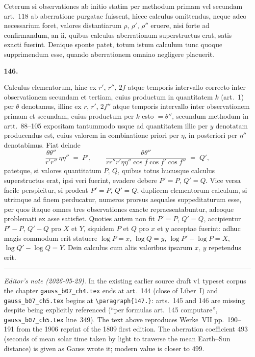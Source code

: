 \documentclass[11pt,a4paper]{article}
\begin{document}
Ceterum si observationes ab initio statim per methodum primam vel
secundam art.~118 ab aberratione purgatae fuissent, hicce calculus
omittendus, neque adeo necessarium foret, valores distantiarum
$\rho$, $\rho'$, $\rho''$ eruere, nisi forte ad confirmandum, an ii,
quibus calculus aberrationum superstructus erat, satis exacti fuerint.
Denique sponte patet, totum istum calculum tunc quoque supprimendum
esse, quando aberrationem omnino negligere placuerit.

\medskip

\begin{center}\textbf{146.}\end{center}

\medskip

Calculus elementorum, hinc ex $r'$, $r''$, $2f$ atque temporis intervallo
correcto inter observationem secundam et tertiam, cuius productum in
quantitatem $k$ (art.~1) per $\theta$ denotamus, illinc ex $r$, $r'$,
$2f''$ atque temporis intervallo inter observationem primam et secundam,
cuius productum per $k$ esto $=\theta''$, secundum methodum in artt.~88--105
expositam tantummodo usque ad quantitatem illic per $y$ denotatam
producendus est, cuius valorem in combinatione priori per $\eta$, in
posteriori per $\eta''$ denotabimus. Fiat deinde
\[
  \frac{\theta\theta''}{r'r''}\,\eta\eta''
   \;=\; P',
  \qquad
  \frac{\theta\theta''}{rr''r'\eta\eta''\cos f\cos f'\cos f''}
   \;=\; Q',
\]
patetque, si valores quantitatum $P$, $Q$, quibus totus hucusque calculus
superstructus erat, ipsi veri fuerint, evadere debere $P' = P$, $Q' = Q$.
Vice versa facile perspicitur, si prodeat $P' = P$, $Q' = Q$, duplicem
elementorum calculum, si utrimque ad finem perducatur, numeros prorsus
aequales suppeditaturum esse, per quos itaque omnes tres observationes
exacte repraesentabuntur, adeoque problemati ex asse satisfiet. Quoties
autem non fit $P' = P$, $Q' = Q$, accipientur $P' - P$, $Q' - Q$ pro
$X$ et $Y$, siquidem $P$ et $Q$ pro $x$ et $y$ acceptae fuerint: adhuc
magis commodum erit statuere $\log P = x$, $\log Q = y$,
$\log P' - \log P = X$, $\log Q' - \log Q = Y$. Dein calculus cum aliis
valoribus ipsarum $x$, $y$ repetendus erit.

\bigskip
\hrule
\bigskip

\noindent\emph{Editor's note (2026-05-29).} In the existing earlier source draft v1
typeset corpus the chapter \verb|gauss_b07_ch4.tex| ends at art.~144
(close of Liber~I) and \verb|gauss_b07_ch5.tex| begins at
\verb|\paragraph{147.}|: arts.~145 and 146 are missing despite being
explicitly referenced (``per formulas art.~145 computare'',
\verb|gauss_b07_ch5.tex| line~349). The text above reproduces Werke~VII
pp.~190--191 from the 1906 reprint of the 1809 first edition. The
aberration coefficient $493$ (seconds of mean solar time taken by light
to traverse the mean Earth--Sun distance) is given as Gauss wrote it;
modern value is closer to $499$.
\end{document}
